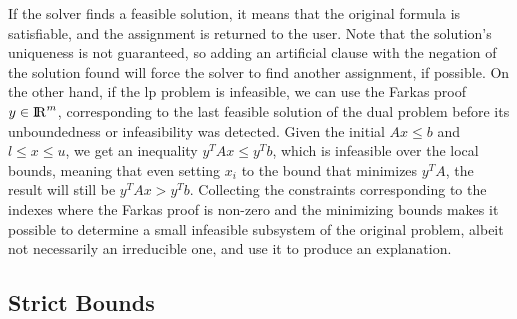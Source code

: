 \documentclass[runningheads]{llncs}
\begin{document}
If the solver finds a feasible solution, it means that the original formula is satisfiable, and the assignment is returned to the user.
Note that the solution's uniqueness is not guaranteed, so adding an artificial clause with the negation of the solution found will force the solver to find another assignment, if possible.
On the other hand, if the \gls{lp} problem is infeasible, we can use the Farkas proof $y \in {\rm I\!R}^m$, corresponding to the last feasible solution of the dual problem before its unboundedness or infeasibility was detected.
Given the initial $Ax \le b$ and $l \le x \le u$, we get an inequality $y^T A x \le y^T b$, which is infeasible over the local bounds, meaning that even setting $x_i$ to the bound that minimizes $y^T A$, the result will still be $y^T A x > y^T b$.
Collecting the constraints corresponding to the indexes where the Farkas proof is non-zero and the minimizing bounds makes it possible to determine a small infeasible subsystem of the original problem, albeit not necessarily an irreducible one, and use it to produce an explanation.

\subsection{Strict Bounds}
\label{sec:strict-bounds}
\end{document}
